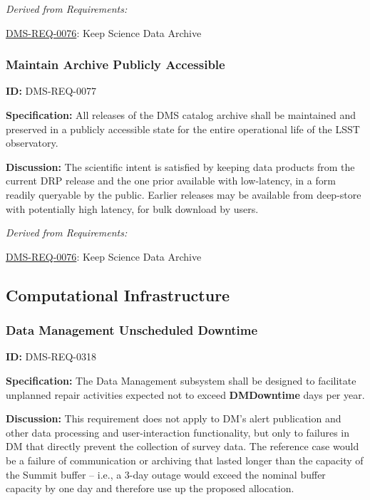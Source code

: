 \documentclass[SE,toc,lsstdraft]{lsstdoc}
\begin{document}
\emph{Derived from Requirements:}

\hyperref[DMS-REQ-0076]{DMS-REQ-0076}:
Keep Science Data Archive \newline


\subsubsection{Maintain Archive Publicly Accessible}

\label{DMS-REQ-0077}
\textbf{ID:} DMS-REQ-0077

\textbf{Specification: }All releases of the DMS catalog archive shall be maintained and preserved in a publicly accessible state for the entire operational life of the LSST observatory.

\textbf{Discussion:} The scientific intent is satisfied by keeping data products from the current DRP release and the one prior available with low-latency, in a form readily queryable by the public. Earlier releases may be available from deep-store with potentially high latency, for bulk download by users.




\emph{Derived from Requirements:}

\hyperref[DMS-REQ-0076]{DMS-REQ-0076}:
Keep Science Data Archive \newline


\subsection{Computational Infrastructure}





\subsubsection{Data Management Unscheduled Downtime}

\label{DMS-REQ-0318}
\textbf{ID:} DMS-REQ-0318

\textbf{Specification:} The Data Management subsystem shall be designed to facilitate unplanned repair activities expected not to exceed \textbf{DMDowntime} days per year.

\textbf{Discussion:} This requirement does not apply to DM's alert publication and other data processing and user-interaction functionality, but only to failures in DM that directly prevent the collection of survey data. The reference case would be a failure of communication or archiving that lasted longer than the capacity of the Summit buffer -- i.e., a 3-day outage would exceed the nominal buffer capacity by one day and therefore use up the proposed allocation.
\end{document}
